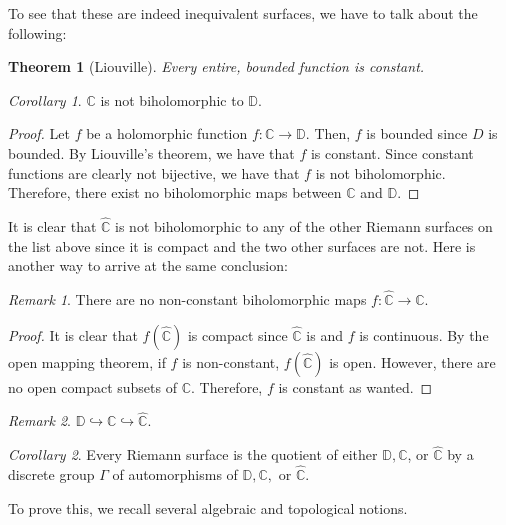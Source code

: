 \documentclass[a4paper, 11pt]{book}
\newtheorem{theorem}{Theorem}
\theoremstyle{definition}
\theoremstyle{remark}
\newtheorem*{remark}{Remark}
\newtheorem{corollary}{Corollary}[theorem]
\begin{document}
    To see that these are indeed inequivalent surfaces, we have to talk about the following:

    \begin{theorem}[Liouville]
        Every entire, bounded function is constant.
    \end{theorem}

    \begin{corollary}
        $\mathbb{C}$ is not biholomorphic to $\mathbb{D}$.
    \end{corollary}
    \begin{proof}
        Let $f$ be a holomorphic function $f:\mathbb{C}\to\mathbb{D}$. Then, $f$ is bounded since $D$ is bounded. By Liouville's
        theorem, we have that $f$ is constant. Since constant functions are clearly not bijective, we have that $f$ is not
        biholomorphic. Therefore, there exist no biholomorphic maps between $\mathbb{C}$ and $\mathbb{D}$. 
    \end{proof}

    It is clear that $\hat{\mathbb{C}}$ is not biholomorphic to any of the other Riemann surfaces on the list above since it is
    compact and the two other surfaces are not. Here is another way to arrive at the same conclusion:

    \begin{remark}
        There are no non-constant biholomorphic maps $f:\hat{\mathbb{C}}\to\mathbb{C}$.
    \end{remark}
    \begin{proof}
        It is clear that $f(\hat{\mathbb{C}})$ is compact since $\hat{\mathbb{C}}$ is and $f$ is continuous. By the open mapping
        theorem, if $f$ is non-constant, $f(\hat{\mathbb{C}})$ is open. However, there are no open compact subsets of $\mathbb{C}$.
        Therefore, $f$ is constant as wanted.
    \end{proof}

    \begin{remark}
        $\mathbb{D}\hookrightarrow \mathbb{C} \hookrightarrow \hat{\mathbb{C}}$.
    \end{remark}

    \begin{corollary}
        Every Riemann surface is the quotient of either $\mathbb{D},\mathbb{C}$, or $\hat{\mathbb{C}}$ by a discrete group $\Gamma$
        of automorphisms of $\mathbb{D},\mathbb{C},$ or $\hat{\mathbb{C}}$.
    \end{corollary}

    To prove this, we recall several algebraic and topological notions.
\end{document}
